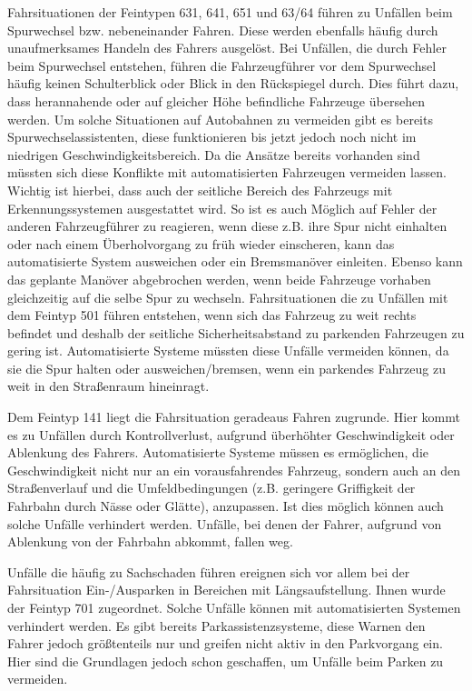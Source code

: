 Fahrsituationen der Feintypen 631, 641, 651 und 63/64 führen zu Unfällen beim Spurwechsel bzw. nebeneinander Fahren. Diese werden ebenfalls häufig durch unaufmerksames Handeln des Fahrers ausgelöst. Bei Unfällen, die durch Fehler beim Spurwechsel entstehen, führen die Fahrzeugführer vor dem Spurwechsel häufig keinen Schulterblick oder Blick in den Rückspiegel durch. Dies führt dazu, dass herannahende oder auf gleicher Höhe befindliche Fahrzeuge übersehen werden. Um solche Situationen auf Autobahnen zu vermeiden gibt es bereits Spurwechselassistenten, diese funktionieren bis jetzt jedoch noch nicht im niedrigen Geschwindigkeitsbereich. Da die Ansätze bereits vorhanden sind müssten sich diese Konflikte mit automatisierten Fahrzeugen vermeiden lassen. Wichtig ist hierbei, dass auch der seitliche Bereich des Fahrzeugs mit Erkennungssystemen ausgestattet wird. So ist es auch Möglich auf Fehler der anderen Fahrzeugführer zu reagieren, wenn diese z.B. ihre Spur nicht einhalten oder nach einem Überholvorgang zu früh wieder einscheren, kann das automatisierte System ausweichen oder ein Bremsmanöver einleiten. Ebenso kann das geplante Manöver abgebrochen werden, wenn beide Fahrzeuge vorhaben gleichzeitig auf die selbe Spur zu wechseln. Fahrsituationen die zu Unfällen mit dem Feintyp 501 führen entstehen, wenn sich das Fahrzeug zu weit rechts befindet und deshalb der seitliche Sicherheitsabstand zu parkenden Fahrzeugen zu gering ist. Automatisierte Systeme müssten diese Unfälle vermeiden können, da sie die Spur halten oder ausweichen/bremsen, wenn ein parkendes Fahrzeug zu weit in den Straßenraum hineinragt.

Dem Feintyp 141 liegt die Fahrsituation geradeaus Fahren zugrunde. Hier kommt es zu Unfällen durch Kontrollverlust, aufgrund überhöhter Geschwindigkeit oder Ablenkung des Fahrers. Automatisierte Systeme müssen es ermöglichen, die Geschwindigkeit nicht nur an ein vorausfahrendes Fahrzeug, sondern auch an den Straßenverlauf und die Umfeldbedingungen (z.B. geringere Griffigkeit der Fahrbahn durch Nässe oder Glätte), anzupassen. Ist dies möglich können auch solche Unfälle verhindert werden. Unfälle, bei denen der Fahrer, aufgrund von Ablenkung von der Fahrbahn abkommt, fallen weg.

Unfälle die häufig zu Sachschaden führen ereignen sich vor allem bei der Fahrsituation Ein-/Ausparken in Bereichen mit Längsaufstellung. Ihnen wurde der Feintyp 701 zugeordnet. Solche Unfälle können mit automatisierten Systemen verhindert werden. Es gibt bereits Parkassistenzsysteme, diese Warnen den Fahrer jedoch größtenteils nur und greifen nicht aktiv in den Parkvorgang ein. Hier sind die Grundlagen jedoch schon geschaffen, um Unfälle beim Parken zu vermeiden.

